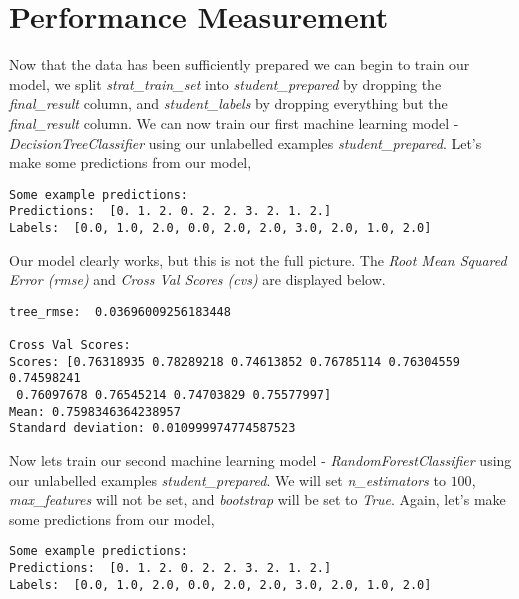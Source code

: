 \documentclass[8pt]{article}
\begin{document}
\section{Performance Measurement}
Now that the data has been sufficiently prepared we can begin to train our model, we split \textit{strat\_train\_set} into \textit{student\_prepared} by dropping the \textit{final\_result} column, and \textit{student\_labels} by dropping everything but the \textit{final\_result} column. We can now train our first machine learning model - \textit{DecisionTreeClassifier} using our unlabelled examples \textit{student\_prepared}. Let's make some predictions from our model,
\newline
\newline
\begin{adjustbox}{max width=\textwidth}
\begin{lstlisting}
Some example predictions:
Predictions:  [0. 1. 2. 0. 2. 2. 3. 2. 1. 2.]
Labels:  [0.0, 1.0, 2.0, 0.0, 2.0, 2.0, 3.0, 2.0, 1.0, 2.0]
\end{lstlisting}
\end{adjustbox}
\newline
\newline
Our model clearly works, but this is not the full picture. The \textit{Root Mean Squared Error (rmse)} and \textit{Cross Val Scores (cvs)} are displayed below.
\newline
\newline
\begin{adjustbox}{max width=\textwidth}
\begin{lstlisting}
tree_rmse:  0.03696009256183448

Cross Val Scores:
Scores: [0.76318935 0.78289218 0.74613852 0.76785114 0.76304559 0.74598241
 0.76097678 0.76545214 0.74703829 0.75577997]
Mean: 0.7598346364238957
Standard deviation: 0.010999974774587523
 \end{lstlisting}
\end{adjustbox}
\newline
\newline
Now lets train our second machine learning model - \textit{RandomForestClassifier} using our unlabelled examples \textit{student\_prepared}. We will set \textit{n\_estimators} to $100$, \textit{max\_features} will not be set, and \textit{bootstrap} will be set to \textit{True}. Again, let's make some predictions from our model,
\newline
\newline
\begin{adjustbox}{max width=\textwidth}
\begin{lstlisting}
Some example predictions:
Predictions:  [0. 1. 2. 0. 2. 2. 3. 2. 1. 2.]
Labels:  [0.0, 1.0, 2.0, 0.0, 2.0, 2.0, 3.0, 2.0, 1.0, 2.0]
\end{lstlisting}
\end{adjustbox}
\end{document}
